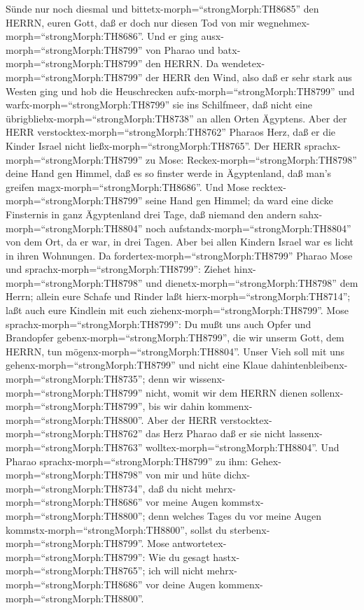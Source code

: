 Sünde nur noch diesmal und bittetx-morph=``strongMorph:TH8685'' den
HERRN, euren Gott, daß er doch nur diesen Tod von mir
wegnehmex-morph=``strongMorph:TH8686''.  Und er ging
ausx-morph=``strongMorph:TH8799'' von Pharao und
batx-morph=``strongMorph:TH8799'' den HERRN.  Da
wendetex-morph=``strongMorph:TH8799'' der HERR den Wind, also daß er
sehr stark aus Westen ging und hob die Heuschrecken
aufx-morph=``strongMorph:TH8799'' und warfx-morph=``strongMorph:TH8799''
sie ins Schilfmeer, daß nicht eine
übrigbliebx-morph=``strongMorph:TH8738'' an allen Orten Ägyptens.
 Aber der HERR verstocktex-morph=``strongMorph:TH8762''
Pharaos Herz, daß er die Kinder Israel nicht
ließx-morph=``strongMorph:TH8765''.  Der HERR
sprachx-morph=``strongMorph:TH8799'' zu Mose:
Reckex-morph=``strongMorph:TH8798'' deine Hand gen Himmel, daß es so
finster werde in Ägyptenland, daß man's greifen
magx-morph=``strongMorph:TH8686''.  Und Mose
recktex-morph=``strongMorph:TH8799'' seine Hand gen Himmel; da ward eine
dicke Finsternis in ganz Ägyptenland drei Tage,  daß
niemand den andern sahx-morph=``strongMorph:TH8804'' noch
aufstandx-morph=``strongMorph:TH8804'' von dem Ort, da er war, in drei
Tagen. Aber bei allen Kindern Israel war es licht in ihren Wohnungen.
 Da fordertex-morph=``strongMorph:TH8799'' Pharao Mose und
sprachx-morph=``strongMorph:TH8799'': Ziehet
hinx-morph=``strongMorph:TH8798'' und
dienetx-morph=``strongMorph:TH8798'' dem Herrn; allein eure Schafe und
Rinder laßt hierx-morph=``strongMorph:TH8714''; laßt auch eure Kindlein
mit euch ziehenx-morph=``strongMorph:TH8799''.  Mose
sprachx-morph=``strongMorph:TH8799'': Du mußt uns auch Opfer und
Brandopfer gebenx-morph=``strongMorph:TH8799'', die wir unserm Gott, dem
HERRN, tun mögenx-morph=``strongMorph:TH8804''.  Unser Vieh
soll mit uns gehenx-morph=``strongMorph:TH8799'' und nicht eine Klaue
dahintenbleibenx-morph=``strongMorph:TH8735''; denn wir
wissenx-morph=``strongMorph:TH8799'' nicht, womit wir dem HERRN dienen
sollenx-morph=``strongMorph:TH8799'', bis wir dahin
kommenx-morph=``strongMorph:TH8800''.  Aber der HERR
verstocktex-morph=``strongMorph:TH8762'' das Herz Pharao daß er sie
nicht lassenx-morph=``strongMorph:TH8763''
wolltex-morph=``strongMorph:TH8804''.  Und Pharao
sprachx-morph=``strongMorph:TH8799'' zu ihm:
Gehex-morph=``strongMorph:TH8798'' von mir und hüte
dichx-morph=``strongMorph:TH8734'', daß du nicht
mehrx-morph=``strongMorph:TH8686'' vor meine Augen
kommstx-morph=``strongMorph:TH8800''; denn welches Tages du vor meine
Augen kommstx-morph=``strongMorph:TH8800'', sollst du
sterbenx-morph=``strongMorph:TH8799''.  Mose
antwortetex-morph=``strongMorph:TH8799'': Wie du gesagt
hastx-morph=``strongMorph:TH8765''; ich will nicht
mehrx-morph=``strongMorph:TH8686'' vor deine Augen
kommenx-morph=``strongMorph:TH8800''.

